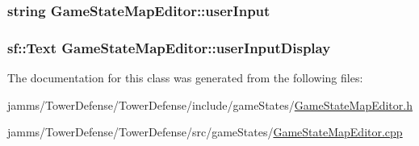 \hypertarget{class_game_state_map_editor_aa3fc0514a4faa043d6789fd830d2c5ef}{
\subsubsection[{user\+Input}]{\setlength{\rightskip}{0pt plus 5cm}string Game\+State\+Map\+Editor\+::user\+Input\hspace{0.3cm}{\ttfamily [private]}}}\label{class_game_state_map_editor_aa3fc0514a4faa043d6789fd830d2c5ef}
\hypertarget{class_game_state_map_editor_aa28847e54111b5131e3825fc6e6c32b2}{
\subsubsection[{user\+Input\+Display}]{\setlength{\rightskip}{0pt plus 5cm}sf\+::\+Text Game\+State\+Map\+Editor\+::user\+Input\+Display\hspace{0.3cm}{\ttfamily [private]}}}\label{class_game_state_map_editor_aa28847e54111b5131e3825fc6e6c32b2}


The documentation for this class was generated from the following files\+:\begin{DoxyCompactItemize}
\item 
jamms/\+Tower\+Defense/\+Tower\+Defense/include/game\+States/\hyperlink{_game_state_map_editor_8h}{Game\+State\+Map\+Editor.\+h}\item 
jamms/\+Tower\+Defense/\+Tower\+Defense/src/game\+States/\hyperlink{_game_state_map_editor_8cpp}{Game\+State\+Map\+Editor.\+cpp}\end{DoxyCompactItemize}
